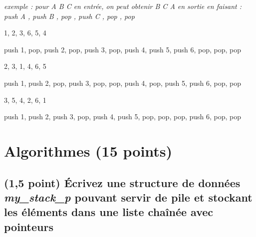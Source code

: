 \documentclass[11pt,a4paper]{article}
\begin{document}
\bigskip

\begin{center}
\noindent \textit{exemple : pour \og A B C \fg{} en entrée, on peut obtenir \og B C A \fg{} en sortie en faisant : \linebreak
\og push A \fg, \og push B \fg, \og pop \fg, \og push C \fg, \og pop \fg, \og pop \fg }
\end{center}

\medskip


\begin{center}

\begin{large}
1, 2, 3, 6, 5, 4
\end{large}

\begin{center}
 push 1, pop, push 2, pop, push 3, pop, push 4, push 5, push 6, pop, pop, pop
\end{center}


\begin{large}
2, 3, 1, 4, 6, 5
\end{large}

\begin{center}
 push 1, push 2, pop, push 3, pop, pop, push 4, pop, push 5, push 6, pop, pop
\end{center}


\begin{large}
3, 5, 4, 2, 6, 1
\end{large}

\begin{center}
 push 1, push 2, push 3, pop, push 4, push 5, pop, pop, pop, push 6, pop, pop
\end{center}

\end{center}

\vfillLast

%
\section{Algorithmes (15 points)}


\subsection{(1,5 point) \'Ecrivez une structure de données \og \textit{my\_stack\_p} \fg{} pouvant servir de pile et stockant les éléments dans une liste chaînée avec pointeurs }
\end{document}
